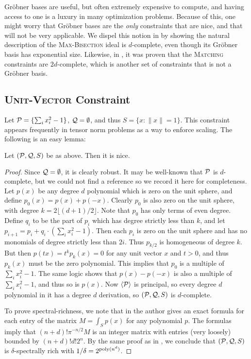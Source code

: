 Gr\"obner bases are useful, but often extremely expensive to compute, and having access to one is a luxury in many optimization problems. Because of this, one might worry that Gr\"obner bases are the \emph{only} constraints that are nice, and that  will not be very applicable. We dispel this notion in  by showing the natural description of the \textsc{Max-Bisection} ideal is $d$-complete, even though its Gr\"obner basis has exponential size. Likewise, in \cite{Braun:2016:MPN:2884435.2884510}, it was proven that the \textsc{Matching} constraints are $2d$-complete, which is another set of constraints that is not a Gr\"obner basis. 

\subsection{\textsc{Unit-Vector} Constraint}
Let $\mathcal P = \{\sum_i x_i^2 - 1\}$, $\mathcal Q = \emptyset$, and thus $S = \{x: \|x\| = 1\}$. This constraint appears frequently in tensor norm problems as a way to enforce scaling. The following is an easy lemma:
\begin{lemma}
Let $(\mathcal P, \mathcal Q, S)$ be as above. Then it is nice. 
\end{lemma}
\begin{proof}
Since $\mathcal Q = \emptyset$, it is clearly robust. It may be well-known that $\mathcal P$ is $d$-complete, but we could not find a reference so we record it here for completeness. Let $p(x)$ be any degree $d$ polynomial which is zero on the unit sphere, and define $p_0(x) = p(x) + p(-x)$. Clearly $p_0$ is also zero on the unit sphere, with degree $k = 2\lfloor (d+1)/2 \rfloor$. Note that $p_0$ has only terms of even degree. Define $q_i$ to be the part of $p_i$ which has degree strictly less than $k$, and let $p_{i+1} = p_i + q_i\cdot(\sum_i x_i^2 - 1)$. Then each $p_i$ is zero on the unit sphere and has no monomials of degree strictly less than $2i$. Thus $p_{k/2}$ is homogeneous of degree $k$. But then $p(tx) = t^kp_k(x) = 0$ for any unit vector $x$ and $t > 0$, and thus $p_k(x)$ must be the zero polynomial. This implies that $p_0$ is a multiple of $\sum_i x_i^2 - 1$. The same logic shows that $p(x) - p(-x)$ is also a multiple of $\sum_i x_i^2 - 1$, and thus so is $p(x)$. Now $\langle \mathcal P\rangle$ is principal, so every degree $d$ polynomial in it has a degree $d$ derivation, so $(\mathcal P, \mathcal Q, S)$ is $d$-complete.

To prove spectral-richness, we note that in \cite{10.2307/2695802} the author gives an exact formula for each entry of the matrix $M = \int_{S} p(x)$ for any polynomial $p$. The formulas imply that $(n+d)!\pi^{-n/2} M$ is an integer matrix with entries (very loosely) bounded by $(n+d)!d!2^n$. By the same proof as in , we conclude that $(\mathcal P, \mathcal Q, S)$ is $\delta$-spectrally rich with $1/\delta = 2^{\operatorname{poly}(n^d)}$.
\end{proof}

